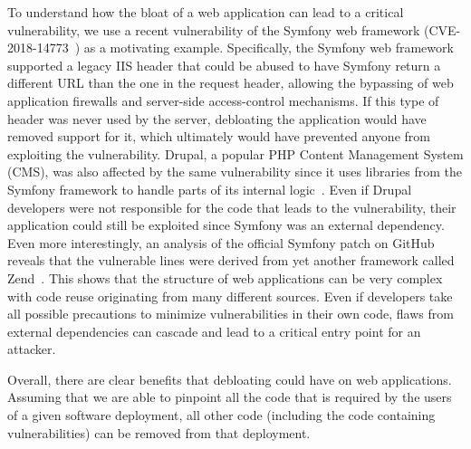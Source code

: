 


To understand how the bloat of a web application can lead to a critical
vulnerability, we use a recent vulnerability of the Symfony web
framework (CVE-2018-14773~\cite{symfonyVulnerability}) as a motivating
example. Specifically, the Symfony web framework supported a legacy IIS
header that could be abused to have Symfony return a different URL than the
one in the request header, allowing the bypassing of web application firewalls
and server-side access-control mechanisms. If this type of header
was never used by the server, debloating the application would have removed
support for it, which ultimately would have prevented anyone from exploiting
the vulnerability. Drupal, a popular PHP Content Management System (CMS), was also affected by
the same vulnerability since it uses libraries from the Symfony framework
to handle parts of its internal logic~\cite{drupalVulenrability}. Even
if Drupal developers were not responsible for the code that leads to the
vulnerability, their application could still be exploited since Symfony
was an external dependency. Even more interestingly, an analysis of the
official Symfony patch on GitHub~\cite{symfonyPatch}
reveals that the vulnerable lines were derived from yet another framework
called Zend~\cite{zendVulnerability}. This shows that the structure of web
applications can be very complex with code reuse originating from many
different sources. Even if developers take all possible precautions to
minimize vulnerabilities in their own code, flaws from external dependencies
can cascade and lead to a critical entry point for an attacker.

Overall, there are clear benefits that debloating could have on web
applications. Assuming that we are able to pinpoint all the code that is required
by the users of a given software deployment, all other code (including the
code containing vulnerabilities) can be removed from that deployment.
